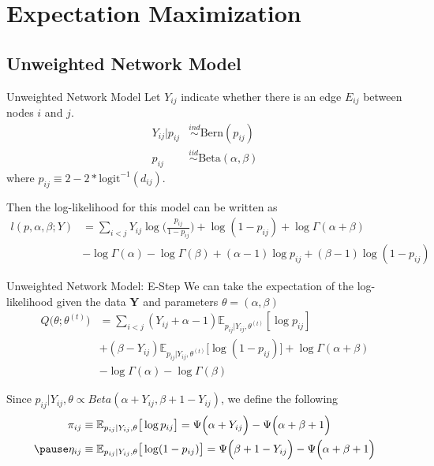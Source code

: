 \documentclass{beamer}
\begin{document}
\section{Expectation Maximization}


\subsection{Unweighted Network Model}
\begin{frame}{Unweighted Network Model}
Let $Y_{ij}$ indicate whether there is an edge $E_{ij}$ between nodes $i$ and $j$.
\begin{align*}
Y_{ij} | p_{ij} &\overset{ind}\sim \text{Bern}(p_{ij}) \\
p_{ij} &\overset{iid}\sim \text{Beta}(\alpha, \beta)
\end{align*}
where $p_{ij} \equiv 2-2*\text{logit}^{-1} (d_{ij})$. \newline\pause 

Then the log-likelihood for this model can be written as
\begin{align*}
l(p, \alpha, \beta ; Y) &= \sum_{i<j} Y_{ij}\log \Big(\frac{p_{ij}}{1 - p_{ij}}\Big) + \log(1-p_{ij})  + \log \Gamma(\alpha + \beta) \\
&- \log \Gamma(\alpha) - \log \Gamma(\beta) + (\alpha - 1)\log p_{ij} + (\beta - 1)\log(1 - p_{ij})
\end{align*}
\end{frame}

\begin{frame}{Unweighted Network Model: E-Step}
We can take the expectation of the log-likelihood given the data \textbf{Y} and parameters $\theta = (\alpha, \beta)$
\begin{align*}
Q\big(\theta; \theta^{(t)}\big) &= \sum_{i<j} (Y_{ij} + \alpha - 1) \mathbb{E}_{p_{ij} | Y_{ij}, \theta^{(t)}} [\log  p_{ij}] \\
&+ (\beta -Y_{ij}) \mathbb{E}_{p_{ij} | Y_{ij}, \theta^{(t)}} \big[\log (1-p_{ij})\big] + \log \Gamma(\alpha + \beta) \\
&- \log \Gamma(\alpha) - \log \Gamma(\beta) 
\end{align*}

Since $p_{ij}|Y_{ij}, \theta \propto Beta(\alpha + Y_{ij}, \beta + 1 - Y_{ij})$, we define the following 
\begin{align*}
\pi_{ij} &\equiv \mathbb{E}_{p_{ij} | Y_{ij}, \theta} \big[\log p_{ij}\big] = \Psi\Big(\alpha + Y_{ij}\Big) - \Psi\Big(\alpha + \beta + 1\Big) \\\pause
\eta_{ij} &\equiv \mathbb{E}_{p_{ij} | Y_{ij}, \theta} \big[\log (1 - p_{ij})\big] = \Psi\Big(\beta + 1 - Y_{ij}\Big) - \Psi\Big(\alpha + \beta + 1\Big)
\end{align*}
\end{frame}
\end{document}
